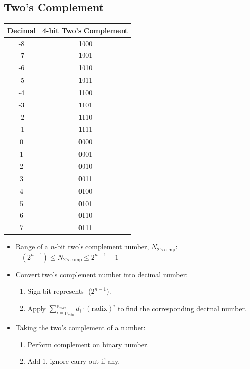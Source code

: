 \documentclass[a4paper]{article}
\begin{document}
\subsection{Two's Complement}
\begin{table}[H]
\centering
\begin{tabular}{cc}
\textbf{Decimal} & \textbf{4-bit Two's Complement} \\ \hline
-8               & \textbf{1}000                   \\
-7               & \textbf{1}001                   \\
-6               & \textbf{1}010                   \\
-5               & \textbf{1}011                   \\ \hline
-4               & \textbf{1}100                   \\
-3               & \textbf{1}101                   \\
-2               & \textbf{1}110                   \\
-1               & \textbf{1}111                   \\ \hline
0                & \textbf{0}000                   \\
1                & \textbf{0}001                   \\
2                & \textbf{0}010                   \\
3                & \textbf{0}011                   \\ \hline
4                & \textbf{0}100                   \\
5                & \textbf{0}101                   \\
6                & \textbf{0}110                   \\
7                & \textbf{0}111                  
\end{tabular}
\end{table}
\begin{itemize}
    \item Range of a $n$-bit two's complement number, $N_\text{2's comp}$: $-(2^{n-1})\leq N_\text{2's comp}\leq 2^{n-1}-1$
    \item Convert two's complement number into decimal number:
    \begin{enumerate}
        \item Sign bit represents -($2^{n-1}$).
        \item Apply $\displaystyle\sum_{i=\text{p}_{min}}^{\text{p}_{max}}d_i\cdot(\text{radix})^i$ to find the corresponding decimal number.
    \end{enumerate}
    \item Taking the two's complement of a number:
    \begin{enumerate}
        \item Perform complement on binary number.
        \item Add 1, ignore carry out if any.
    \end{enumerate}
\end{itemize}
\end{document}
